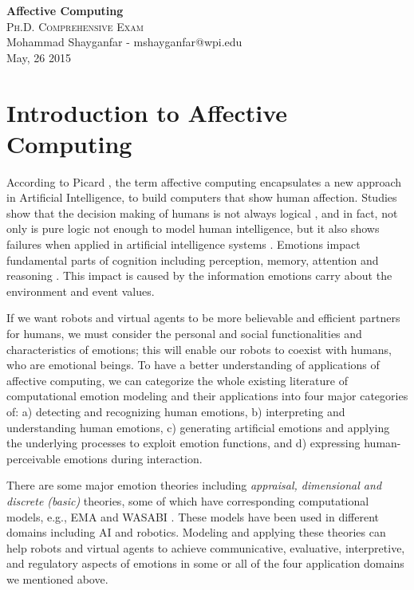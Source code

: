 \documentclass[11pt]{article}
\begin{document}

\begin{center}
{\LARGE{\textbf{Affective Computing}}} \\
\Large\textsc{Ph.D. Comprehensive Exam} \\[1em]
\large\textnormal{Mohammad Shayganfar - mshayganfar@wpi.edu} \\
\large\textnormal{May, 26 2015}
\end{center}

\section{Introduction to Affective Computing}
According to Picard \cite{picard:affective-computing}, the term affective
computing encapsulates a new approach in Artificial Intelligence, to build
computers that show human affection. Studies show that the decision making of
humans is not always logical \cite{GrossbergGutowski:affect-cognition}, and in
fact, not only is pure logic not enough to model human intelligence, but it also
shows failures when applied in artificial intelligence systems
\cite{dreyfus:artificial-critique}. Emotions impact fundamental parts of
cognition including perception, memory, attention and reasoning
\cite{clore:judgement-regulation}. This impact is caused by the information
emotions carry about the environment and event values.

If we want robots and virtual agents to be more believable and efficient
partners for humans, we must consider the personal and social functionalities
and characteristics of emotions; this will enable our robots to coexist with
humans, who are emotional beings. To have a better understanding of applications
of affective computing, we can categorize the whole existing literature of
computational emotion modeling and their applications into four major categories
of: a) detecting and recognizing human emotions, b) interpreting and
understanding human emotions, c) generating artificial emotions and applying the
underlying processes to exploit emotion functions, and d) expressing
human-perceivable emotions during interaction.

There are some major emotion theories including \textit{appraisal, dimensional
and discrete (basic)} theories, some of which have corresponding computational
models, e.g., EMA \cite{marsella:ema-process-model} and WASABI
\cite{becker:wasabi,becker:wasabi-description}. These models have been used in
different domains including AI and robotics. Modeling and applying these
theories can help robots and virtual agents to achieve communicative,
evaluative, interpretive, and regulatory aspects of emotions in some or all of
the four application domains we mentioned above.
\end{document}
